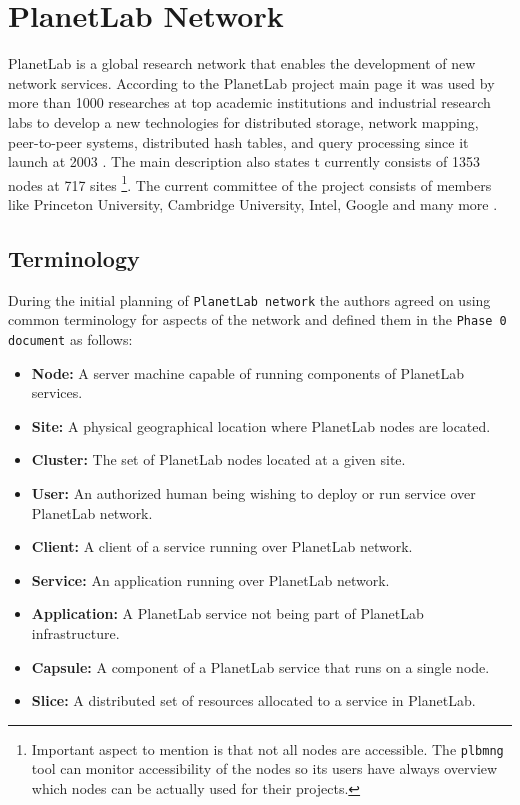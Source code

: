 \chapter{PlanetLab Network}
\label{chapter:planetlabnetwork}
PlanetLab is a global research network that enables the development of new network services. According to the PlanetLab project main page it was used by more than 1000 researches at top academic institutions and industrial research labs to develop a new technologies for distributed storage, network mapping, peer-to-peer systems, distributed hash tables, and query processing since it launch at 2003 \cite{planetlabmain}. The main description also states t currently consists of 1353 nodes at 717 sites \footnote{Important aspect to mention is that not all nodes are accessible. The \texttt{plbmng} tool can monitor accessibility of the nodes so its users have always overview which nodes can be actually used for their projects.}. The current committee of the project consists of members like Princeton University, Cambridge University, Intel, Google and many more \cite{planetlabmain}.\\

\section{Terminology}
During the initial planning of \texttt{PlanetLab network} the authors agreed on using common terminology for aspects of the network and defined them in the \texttt{Phase 0 document} \cite{Roscoe_PDN-02-002} as follows:
\begin{itemize}
	\item \textbf{Node:} A server machine capable of running components of PlanetLab services.
	\item \textbf{Site:} A physical geographical location where PlanetLab nodes are located.
	\item \textbf{Cluster:} The set of PlanetLab nodes located at a given site.
	\item \textbf{User:} An authorized human being wishing to deploy or run service over PlanetLab network.
	\item \textbf{Client:} A client of a service running over PlanetLab network.
	\item \textbf{Service:} An application running over PlanetLab network.
	\item \textbf{Application:} A PlanetLab service not being part of PlanetLab infrastructure. 
	\item \textbf{Capsule:} A component of a PlanetLab service that runs on a single node.
	\item \textbf{Slice:} A distributed set of resources allocated to a service in PlanetLab.
\end{itemize}
